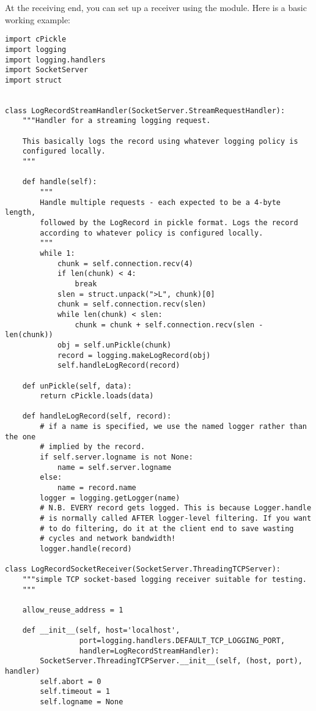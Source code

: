 At the receiving end, you can set up a receiver using the
 module. Here is a basic working example:

\begin{verbatim}
import cPickle
import logging
import logging.handlers
import SocketServer
import struct


class LogRecordStreamHandler(SocketServer.StreamRequestHandler):
    """Handler for a streaming logging request.

    This basically logs the record using whatever logging policy is
    configured locally.
    """

    def handle(self):
        """
        Handle multiple requests - each expected to be a 4-byte length,
        followed by the LogRecord in pickle format. Logs the record
        according to whatever policy is configured locally.
        """
        while 1:
            chunk = self.connection.recv(4)
            if len(chunk) < 4:
                break
            slen = struct.unpack(">L", chunk)[0]
            chunk = self.connection.recv(slen)
            while len(chunk) < slen:
                chunk = chunk + self.connection.recv(slen - len(chunk))
            obj = self.unPickle(chunk)
            record = logging.makeLogRecord(obj)
            self.handleLogRecord(record)

    def unPickle(self, data):
        return cPickle.loads(data)

    def handleLogRecord(self, record):
        # if a name is specified, we use the named logger rather than the one
        # implied by the record.
        if self.server.logname is not None:
            name = self.server.logname
        else:
            name = record.name
        logger = logging.getLogger(name)
        # N.B. EVERY record gets logged. This is because Logger.handle
        # is normally called AFTER logger-level filtering. If you want
        # to do filtering, do it at the client end to save wasting
        # cycles and network bandwidth!
        logger.handle(record)

class LogRecordSocketReceiver(SocketServer.ThreadingTCPServer):
    """simple TCP socket-based logging receiver suitable for testing.
    """

    allow_reuse_address = 1

    def __init__(self, host='localhost',
                 port=logging.handlers.DEFAULT_TCP_LOGGING_PORT,
                 handler=LogRecordStreamHandler):
        SocketServer.ThreadingTCPServer.__init__(self, (host, port), handler)
        self.abort = 0
        self.timeout = 1
        self.logname = None


\end{verbatim}
